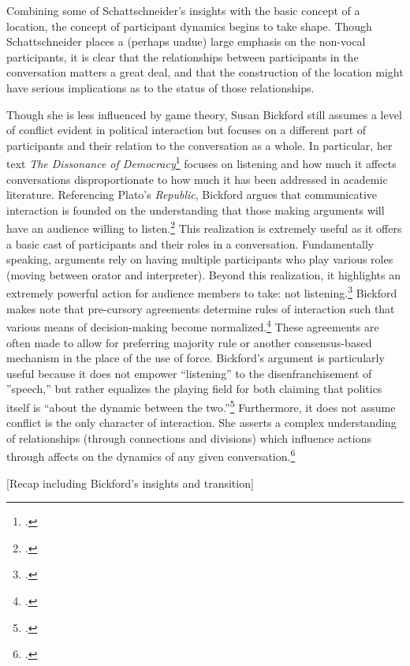 \documentclass{article}
\begin{document}
Combining some of Schattschneider's insights with the basic concept of a location, the concept of participant dynamics begins to take shape.
Though Schattschneider places a (perhaps undue) large emphasis on the non-vocal participants, it is clear that the relationships between participants in the conversation matters a great deal, and that the construction of the location might have serious implications as to the status of those relationships.

Though she is less influenced by game theory, Susan Bickford still assumes a level of conflict evident in political interaction but focuses on a different part of participants and their relation to the conversation as a whole.
In particular, her text \emph{The Dissonance of Democracy}\footcite{bickford96} focuses on listening and how much it affects conversations disproportionate to how much it has been addressed in academic literature. 
Referencing Plato's \emph{Republic}, Bickford argues that communicative interaction is founded on the understanding that those making arguments will have an audience willing to listen.\footcite[3]{bickford96}
This realization is extremely useful as it offers a basic cast of participants and their roles in a conversation.
Fundamentally speaking, arguments rely on having multiple participants who play various roles (moving between orator and interpreter).
Beyond this realization, it highlights an extremely powerful action for audience members to take: not listening.\footcite[3]{bickford96}
Bickford makes note that pre-cursory agreements determine rules of interaction such that various means of decision-making become normalized.\footcite[3--5. Simply put, these pre-cursory agreements can be understood as ``constitutions.'']{bickford96}
These agreements are often made to allow for preferring majority rule or another consensus-based mechanism in the place of the use of force.
Bickford's argument is particularly useful because it does not empower ``listening'' to the disenfranchisement of ''speech,'' but rather equalizes the playing field for both claiming that politics itself is ``about the dynamic between the two.''\footcite[4]{bickford96}
Furthermore, it does not assume conflict is the only character of interaction.
She asserts a complex understanding of relationships (through connections and divisions) which influence actions through affects on the dynamics of any given conversation.\footcite[9--11]{bickford96}

[Recap including Bickford's insights and transition]
\end{document}
